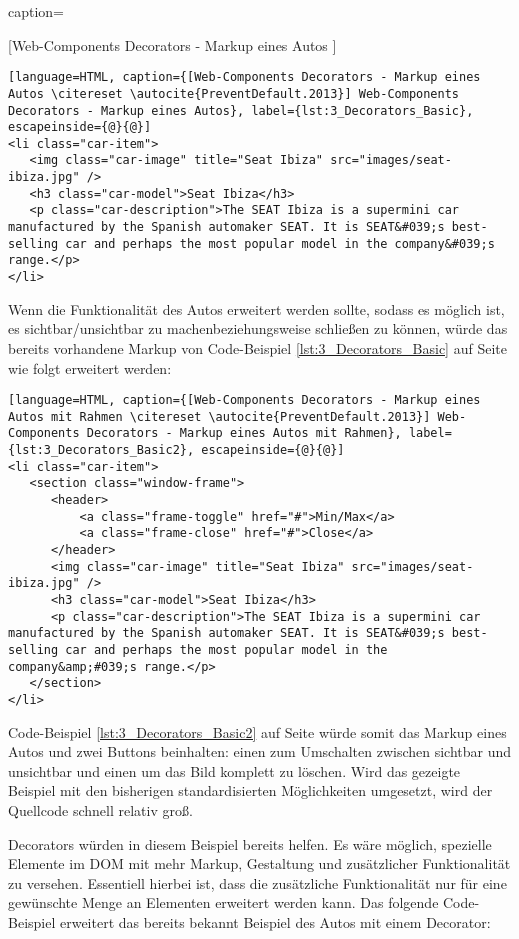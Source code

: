 caption={[Web-Components Decorators - Markup eines Autos \citereset \autocite{PreventDefault.2013}]

\begin{lstlisting}[language=HTML, caption={[Web-Components Decorators - Markup eines Autos \citereset \autocite{PreventDefault.2013}] Web-Components Decorators - Markup eines Autos}, label={lst:3_Decorators_Basic}, escapeinside={@}{@}]
<li class="car-item">
   <img class="car-image" title="Seat Ibiza" src="images/seat-ibiza.jpg" />
   <h3 class="car-model">Seat Ibiza</h3>
   <p class="car-description">The SEAT Ibiza is a supermini car manufactured by the Spanish automaker SEAT. It is SEAT&#039;s best-selling car and perhaps the most popular model in the company&#039;s range.</p>
</li>
\end{lstlisting}


Wenn die Funktionalität des Autos erweitert werden sollte, sodass es möglich ist, es sichtbar/unsichtbar zu machenbeziehungsweise schließen zu können, würde das bereits vorhandene Markup von Code-Beispiel \ref{lst:3_Decorators_Basic} auf Seite \pageref{lst:3_Decorators_Basic} wie folgt erweitert werden:

\begin{lstlisting}[language=HTML, caption={[Web-Components Decorators - Markup eines Autos mit Rahmen \citereset \autocite{PreventDefault.2013}] Web-Components Decorators - Markup eines Autos mit Rahmen}, label={lst:3_Decorators_Basic2}, escapeinside={@}{@}]
<li class="car-item">
   <section class="window-frame">
      <header>
          <a class="frame-toggle" href="#">Min/Max</a>
          <a class="frame-close" href="#">Close</a>
      </header>
      <img class="car-image" title="Seat Ibiza" src="images/seat-ibiza.jpg" />
      <h3 class="car-model">Seat Ibiza</h3>
      <p class="car-description">The SEAT Ibiza is a supermini car manufactured by the Spanish automaker SEAT. It is SEAT&#039;s best-selling car and perhaps the most popular model in the company&amp;#039;s range.</p>
   </section>
</li>
\end{lstlisting}

Code-Beispiel \ref{lst:3_Decorators_Basic2} auf Seite \pageref{lst:3_Decorators_Basic2} würde somit das Markup eines Autos und zwei Buttons beinhalten: einen zum Umschalten zwischen sichtbar und unsichtbar und einen um das Bild komplett zu löschen.
Wird das gezeigte Beispiel mit den bisherigen standardisierten Möglichkeiten umgesetzt, wird der Quellcode schnell relativ groß.

Decorators würden in diesem Beispiel bereits helfen. Es wäre möglich, spezielle Elemente im DOM mit mehr Markup, Gestaltung und zusätzlicher Funktionalität zu versehen. Essentiell hierbei ist, dass die zusätzliche Funktionalität nur für eine gewünschte Menge an Elementen erweitert werden kann. Das folgende Code-Beispiel erweitert das bereits bekannt Beispiel des Autos mit einem Decorator:

}
